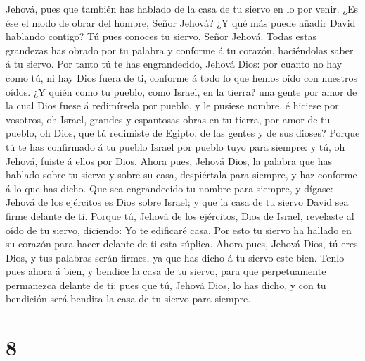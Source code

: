 Jehová, pues que también has hablado de la casa de tu siervo en lo por
venir. ¿Es ése el modo de obrar del hombre, Señor Jehová? 
¿Y qué más puede añadir David hablando contigo? Tú pues conoces tu
siervo, Señor Jehová.  Todas estas grandezas has obrado por
tu palabra y conforme á tu corazón, haciéndolas saber á tu siervo.
 Por tanto tú te has engrandecido, Jehová Dios: por cuanto
no hay como tú, ni hay Dios fuera de ti, conforme á todo lo que hemos
oído con nuestros oídos.  ¿Y quién como tu pueblo, como
Israel, en la tierra? una gente por amor de la cual Dios fuese á
redimírsela por pueblo, y le pusiese nombre, é hiciese por vosotros, oh
Israel, grandes y espantosas obras en tu tierra, por amor de tu pueblo,
oh Dios, que tú redimiste de Egipto, de las gentes y de sus dioses?
 Porque tú te has confirmado á tu pueblo Israel por pueblo
tuyo para siempre: y tú, oh Jehová, fuiste á ellos por Dios.
 Ahora pues, Jehová Dios, la palabra que has hablado sobre
tu siervo y sobre su casa, despiértala para siempre, y haz conforme á lo
que has dicho.  Que sea engrandecido tu nombre para
siempre, y dígase: Jehová de los ejércitos es Dios sobre Israel; y que
la casa de tu siervo David sea firme delante de ti.  Porque
tú, Jehová de los ejércitos, Dios de Israel, revelaste al oído de tu
siervo, diciendo: Yo te edificaré casa. Por esto tu siervo ha hallado en
su corazón para hacer delante de ti esta súplica.  Ahora
pues, Jehová Dios, tú eres Dios, y tus palabras serán firmes, ya que has
dicho á tu siervo este bien.  Tenlo pues ahora á bien, y
bendice la casa de tu siervo, para que perpetuamente permanezca delante
de ti: pues que tú, Jehová Dios, lo has dicho, y con tu bendición será
bendita la casa de tu siervo para siempre.

\hypertarget{section-7}{%
\section{8}\label{section-7}}

